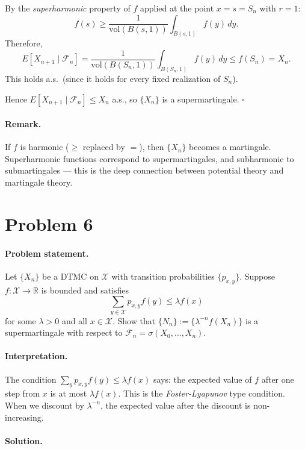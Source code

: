 \documentclass[11pt]{article}
\newcommand{\R}{\mathbb{R}}
\newcommand{\1}{\mathbf{1}}
\newcommand{\vol}{\mathrm{vol}}
\theoremstyle{plain}
\begin{document}
By the \emph{superharmonic} property of $f$ applied at the point $x=s=S_n$ with
$r=1$:
\[
  f(s) \ge \frac{1}{\vol(B(s,1))}\int_{B(s,1)}f(y)\,dy.
\]
Therefore,
\[
  E[X_{n+1}\mid\mathcal{F}_n]
  = \frac{1}{\vol(B(S_n,1))}\int_{B(S_n,1)}f(y)\,dy
  \le f(S_n) = X_n.
\]
This holds a.s.\ (since it holds for every fixed realization of $S_n$).

Hence $E[X_{n+1}\mid\mathcal{F}_n]\le X_n$ a.s., so $\{X_n\}$ is a supermartingale.
$\square$

\paragraph{Remark.}
If $f$ is harmonic ($\ge$ replaced by $=$), then $\{X_n\}$ becomes a martingale.
Superharmonic functions correspond to supermartingales, and subharmonic to
submartingales --- this is the deep connection between potential theory and
martingale theory.

\section*{Problem 6}

\paragraph{Problem statement.}
Let $\{X_n\}$ be a DTMC on $\mathcal{X}$ with transition probabilities $\{p_{x,y}\}$.
Suppose $f:\mathcal{X}\to\R$ is bounded and satisfies
\[
  \sum_{y\in\mathcal{X}}p_{x,y}f(y)\le\lambda f(x)
\]
for some $\lambda>0$ and all $x\in\mathcal{X}$. Show that
$\{N_n\}:=\{\lambda^{-n}f(X_n)\}$ is a supermartingale with respect to
$\mathcal{F}_n=\sigma(X_0,\ldots,X_n)$.

\paragraph{Interpretation.}
The condition $\sum_y p_{x,y}f(y)\le\lambda f(x)$ says: the expected value of
$f$ after one step from $x$ is at most $\lambda f(x)$. This is the \emph{Foster-Lyapunov}
type condition. When we discount by $\lambda^{-n}$, the expected value after the
discount is non-increasing.

\paragraph{Solution.}
\end{document}
